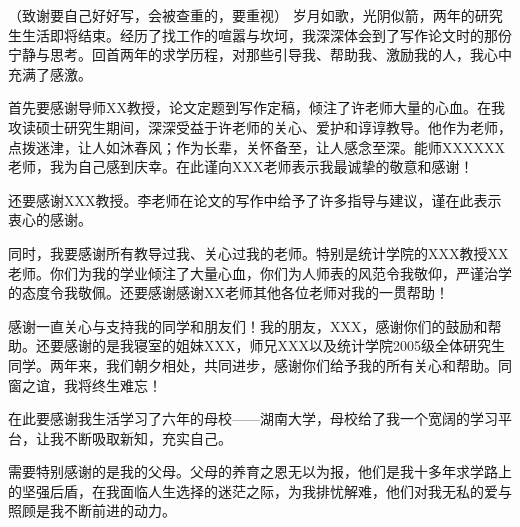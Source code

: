 

\begin{ack}
   （致谢要自己好好写，会被查重的，要重视）
 岁月如歌，光阴似箭，两年的研究生生活即将结束。经历了找工作的喧嚣与坎坷，我深深体会到了写作论文时的那份宁静与思考。回首两年的求学历程，对那些引导我、帮助我、激励我的人，我心中充满了感激。

   首先要感谢导师XX教授，论文定题到写作定稿，倾注了许老师大量的心血。在我攻读硕士研究生期间，深深受益于许老师的关心、爱护和谆谆教导。他作为老师，点拨迷津，让人如沐春风；作为长辈，关怀备至，让人感念至深。能师XXXXXX老师，我为自己感到庆幸。在此谨向XXX老师表示我最诚挚的敬意和感谢！

   还要感谢XXX教授。李老师在论文的写作中给予了许多指导与建议，谨在此表示衷心的感谢。

   同时，我要感谢所有教导过我、关心过我的老师。特别是统计学院的XXX教授XX老师。你们为我的学业倾注了大量心血，你们为人师表的风范令我敬仰，严谨治学的态度令我敬佩。还要感谢感谢XX老师其他各位老师对我的一贯帮助！

   感谢一直关心与支持我的同学和朋友们！我的朋友，XXX，感谢你们的鼓励和帮助。还要感谢的是我寝室的姐妹XXX，师兄XXX以及统计学院2005级全体研究生同学。两年来，我们朝夕相处，共同进步，感谢你们给予我的所有关心和帮助。同窗之谊，我将终生难忘！

   在此要感谢我生活学习了六年的母校——湖南大学，母校给了我一个宽阔的学习平台，让我不断吸取新知，充实自己。

   需要特别感谢的是我的父母。父母的养育之恩无以为报，他们是我十多年求学路上的坚强后盾，在我面临人生选择的迷茫之际，为我排忧解难，他们对我无私的爱与照顾是我不断前进的动力。
\end{ack}
